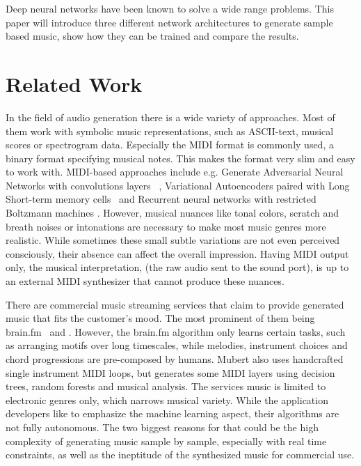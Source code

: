 \documentclass[12pt]{article}
\begin{document}
Deep neural networks have been known to solve a wide range problems.
This paper will introduce three different network architectures to generate sample based music, show how they can be trained and compare the results.


\section{Related Work}
In the field of audio generation there is a wide variety of approaches.
Most of them work with symbolic music representations, such as ASCII-text, musical scores or spectrogram data.
Especially the MIDI format is commonly used, a binary format specifying musical notes.
This makes the format very slim and easy to work with.
MIDI-based approaches include e.g. Generate Adversarial Neural Networks with convolutions layers ~\cite{yang2017midinet, mogren2016c, mogren2016c}, Variational Autoencoders paired with Long Short-term memory cells~\cite{roberts2018hierarchical, tikhonov2017music, hennig2017classifying} and Recurrent neural networks with restricted Boltzmann machines \cite{boulanger2012modeling}.
However, musical nuances like tonal colors, scratch and breath noises or intonations are necessary to make most music genres more realistic.
While sometimes these small subtle variations are not even perceived consciously, their absence can affect the overall impression. 
Having MIDI output only, the musical interpretation, (the raw audio sent to the sound port), is up to an external MIDI synthesizer that cannot produce these nuances.

There are commercial music streaming services that claim to provide generated music that fits the customer's mood.
The most prominent of them being brain.fm~\cite{brain.fm} and \cite{mubert}.
However, the brain.fm algorithm only learns certain tasks, such as arranging motifs over long timescales, while melodies, instrument choices and chord progressions are pre-composed by humans.
Mubert also uses handcrafted single instrument MIDI loops, but generates some MIDI layers using decision trees, random forests and musical analysis.
The services music is limited to electronic genres only, which narrows musical variety.
While the application developers like to emphasize the machine learning aspect, their algorithms are not fully autonomous.
The two biggest reasons for that could be the high complexity of generating music sample by sample, especially with real time constraints, as well as the ineptitude of the synthesized music for commercial use.
\end{document}
